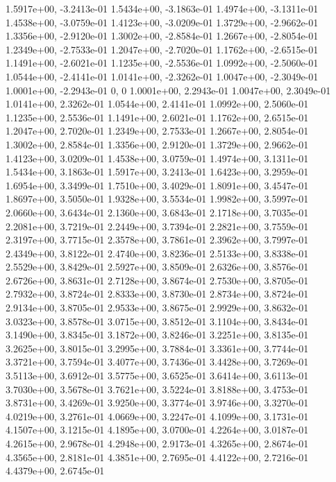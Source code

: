 {  1.5917e+00, -3.2413e-01
  1.5434e+00, -3.1863e-01
  1.4974e+00, -3.1311e-01
  1.4538e+00, -3.0759e-01
  1.4123e+00, -3.0209e-01
  1.3729e+00, -2.9662e-01
  1.3356e+00, -2.9120e-01
  1.3002e+00, -2.8584e-01
  1.2667e+00, -2.8054e-01
  1.2349e+00, -2.7533e-01
  1.2047e+00, -2.7020e-01
  1.1762e+00, -2.6515e-01
  1.1491e+00, -2.6021e-01
  1.1235e+00, -2.5536e-01
  1.0992e+00, -2.5060e-01
  1.0544e+00, -2.4141e-01
  1.0141e+00, -2.3262e-01
  1.0047e+00, -2.3049e-01
  1.0001e+00, -2.2943e-01
  0, 0
  1.0001e+00, 2.2943e-01
  1.0047e+00, 2.3049e-01
  1.0141e+00, 2.3262e-01
  1.0544e+00, 2.4141e-01
  1.0992e+00, 2.5060e-01
  1.1235e+00, 2.5536e-01
  1.1491e+00, 2.6021e-01
  1.1762e+00, 2.6515e-01
  1.2047e+00, 2.7020e-01
  1.2349e+00, 2.7533e-01
  1.2667e+00, 2.8054e-01
  1.3002e+00, 2.8584e-01
  1.3356e+00, 2.9120e-01
  1.3729e+00, 2.9662e-01
  1.4123e+00, 3.0209e-01
  1.4538e+00, 3.0759e-01
  1.4974e+00, 3.1311e-01
  1.5434e+00, 3.1863e-01
  1.5917e+00, 3.2413e-01
  1.6423e+00, 3.2959e-01
  1.6954e+00, 3.3499e-01
  1.7510e+00, 3.4029e-01
  1.8091e+00, 3.4547e-01
  1.8697e+00, 3.5050e-01
  1.9328e+00, 3.5534e-01
  1.9982e+00, 3.5997e-01
  2.0660e+00, 3.6434e-01
  2.1360e+00, 3.6843e-01
  2.1718e+00, 3.7035e-01
  2.2081e+00, 3.7219e-01
  2.2449e+00, 3.7394e-01
  2.2821e+00, 3.7559e-01
  2.3197e+00, 3.7715e-01
  2.3578e+00, 3.7861e-01
  2.3962e+00, 3.7997e-01
  2.4349e+00, 3.8122e-01
  2.4740e+00, 3.8236e-01
  2.5133e+00, 3.8338e-01
  2.5529e+00, 3.8429e-01
  2.5927e+00, 3.8509e-01
  2.6326e+00, 3.8576e-01
  2.6726e+00, 3.8631e-01
  2.7128e+00, 3.8674e-01
  2.7530e+00, 3.8705e-01
  2.7932e+00, 3.8724e-01
  2.8333e+00, 3.8730e-01
  2.8734e+00, 3.8724e-01
  2.9134e+00, 3.8705e-01
  2.9533e+00, 3.8675e-01
  2.9929e+00, 3.8632e-01
  3.0323e+00, 3.8578e-01
  3.0715e+00, 3.8512e-01
  3.1104e+00, 3.8434e-01
  3.1490e+00, 3.8345e-01
  3.1872e+00, 3.8246e-01
  3.2251e+00, 3.8135e-01
  3.2625e+00, 3.8015e-01
  3.2995e+00, 3.7884e-01
  3.3361e+00, 3.7744e-01
  3.3721e+00, 3.7594e-01
  3.4077e+00, 3.7436e-01
  3.4428e+00, 3.7269e-01
  3.5113e+00, 3.6912e-01
  3.5775e+00, 3.6525e-01
  3.6414e+00, 3.6113e-01
  3.7030e+00, 3.5678e-01
  3.7621e+00, 3.5224e-01
  3.8188e+00, 3.4753e-01
  3.8731e+00, 3.4269e-01
  3.9250e+00, 3.3774e-01
  3.9746e+00, 3.3270e-01
  4.0219e+00, 3.2761e-01
  4.0669e+00, 3.2247e-01
  4.1099e+00, 3.1731e-01
  4.1507e+00, 3.1215e-01
  4.1895e+00, 3.0700e-01
  4.2264e+00, 3.0187e-01
  4.2615e+00, 2.9678e-01
  4.2948e+00, 2.9173e-01
  4.3265e+00, 2.8674e-01
  4.3565e+00, 2.8181e-01
  4.3851e+00, 2.7695e-01
  4.4122e+00, 2.7216e-01
  4.4379e+00, 2.6745e-01
}
